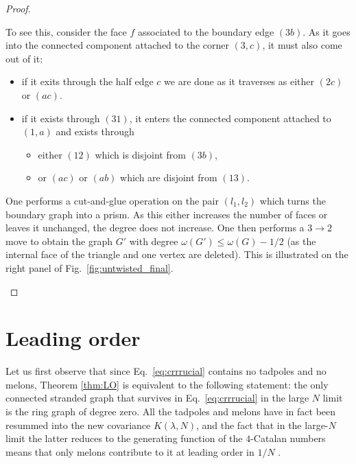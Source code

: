 \documentclass[10pt]{article}
\theoremstyle{plain}
\theoremstyle{definition}
\begin{document}
\begin{proof}
\begin{description}
\begin{itemize}
\begin{itemize}
 To see this, consider the face $f$ associated to the boundary edge $(3b)$. As it goes into the connected component attached to the corner $(3,c)$, it must also come out of it:
\begin{itemize}
 \item if it exits through the half edge $c$ we are done as it traverses as either $(2c)$ or $(ac)$.
 \item if it exists through $(31)$, it enters the connected component attached to $(1,a)$ and exists through
   \begin{itemize}
    \item either $(12)$ which is disjoint from $(3b)$,
    \item or $(ac)$ or $(ab)$ which are disjoint from $(13)$.
   \end{itemize}
\end{itemize}

One performs a cut-and-glue operation on the pair $(l_1, l_2)$ which turns the boundary graph into a prism. As this either increases the number of faces or leaves it unchanged, the degree 
does not increase. One then performs a $3\to2$ move to obtain the graph $G'$ with degree $\omega(G') \le \omega(G) - 1/2$ (as the internal face of the triangle and one vertex are deleted).
This is illustrated on the right panel of Fig.~\ref{fig:untwisted_final}.

  \end{itemize}


\end{itemize}




\end{description} 

\end{proof}



 
\newpage
 


\section{Leading order}\label{sec:LO}

Let us first observe that since  Eq.~\ref{eq:crrrucial} contains no tadpoles and no melons, Theorem \ref{thm:LO} is equivalent to the following statement: the only connected stranded graph that survives in Eq.~\ref{eq:crrrucial} in the large $N$ limit is the ring graph of degree zero. All the tadpoles and melons have in fact been resummed into the new  covariance $K (\lambda, N)$, and the fact that in the large-$N$ limit the latter reduces to the generating function of the $4$-Catalan numbers means that only melons contribute to it at leading order in $1/N$ \cite{RTM}.
 
\end{document}
